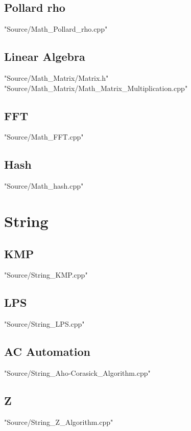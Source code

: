 \documentclass [12pt,twocolumn,oneside]{article}
\begin{document}
\subsection{Pollard rho}
 {"Source/Math_Pollard_rho.cpp"}

\subsection{Linear Algebra}
 {"Source/Math_Matrix/Matrix.h"}
 {"Source/Math_Matrix/Math_Matrix_Multiplication.cpp"}

\subsection{FFT}
 {"Source/Math_FFT.cpp"}

\subsection{Hash}
 {"Source/Math_hash.cpp"}




\newpage
\section{String}
\subsection{KMP}
 {"Source/String_KMP.cpp"}

\subsection{LPS}
 {"Source/String_LPS.cpp"}

\subsection{AC Automation}
 {"Source/String_Aho-Corasick_Algorithm.cpp"}

\subsection{Z}
 {"Source/String_Z_Algorithm.cpp"}
\end{document}
